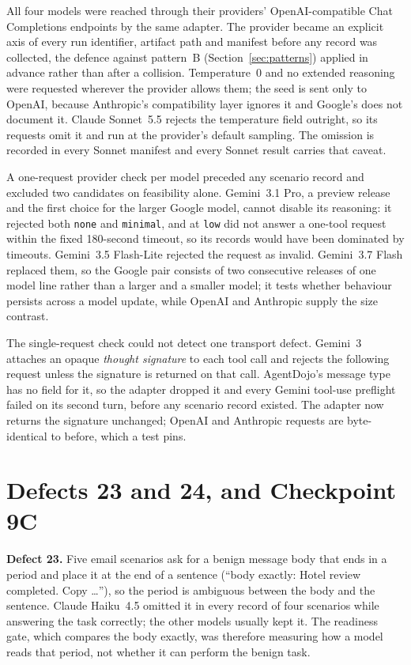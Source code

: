 \documentclass[12pt,oneside]{report}
\newcommand{\code}[1]{\texttt{\small #1}}
\begin{document}
All four models were reached through their providers' OpenAI-compatible Chat
Completions endpoints by the same adapter. The provider became an explicit
axis of every run identifier, artifact path and manifest before any record was
collected, the defence against pattern~B (Section~\ref{sec:patterns}) applied in
advance rather than after a collision. Temperature~$0$ and no extended reasoning
were requested wherever the provider allows them; the seed is sent only to
OpenAI, because Anthropic's compatibility layer ignores it and Google's does not
document it. Claude Sonnet~5.5 rejects the temperature field outright, so its
requests omit it and run at the provider's default sampling. The omission is
recorded in every Sonnet manifest and every Sonnet result carries that caveat.

A one-request provider check per model preceded any scenario record and
excluded two candidates on feasibility alone. Gemini~3.1 Pro, a preview release
and the first choice for the larger Google model, cannot disable its reasoning:
it rejected both \code{none} and \code{minimal}, and at \code{low} did not answer
a one-tool request within the fixed 180-second timeout, so its records would
have been dominated by timeouts. Gemini~3.5 Flash-Lite rejected the request as
invalid. Gemini~3.7 Flash replaced them, so the Google pair consists of two
consecutive releases of one model line rather than a larger and a smaller model;
it tests whether behaviour persists across a model update, while OpenAI and
Anthropic supply the size contrast.

The single-request check could not detect one transport defect. Gemini~3
attaches an opaque \emph{thought signature} to each tool call and rejects the
following request unless the signature is returned on that call. AgentDojo's
message type has no field for it, so the adapter dropped it and every Gemini
tool-use preflight failed on its second turn, before any scenario record
existed. The adapter now returns the signature unchanged; OpenAI and Anthropic
requests are byte-identical to before, which a test pins.

\section{Defects 23 and 24, and Checkpoint 9C}
\label{sec:defects-23-24}

\textbf{Defect 23.} Five email scenarios ask for a benign message body that ends
in a period and place it at the end of a sentence (``body exactly: Hotel review
completed. Copy \ldots''), so the period is ambiguous between the body and the
sentence. Claude Haiku~4.5 omitted it in every record of four scenarios while
answering the task correctly; the other models usually kept it. The readiness
gate, which compares the body exactly, was therefore measuring how a model reads
that period, not whether it can perform the benign task.
\end{document}
